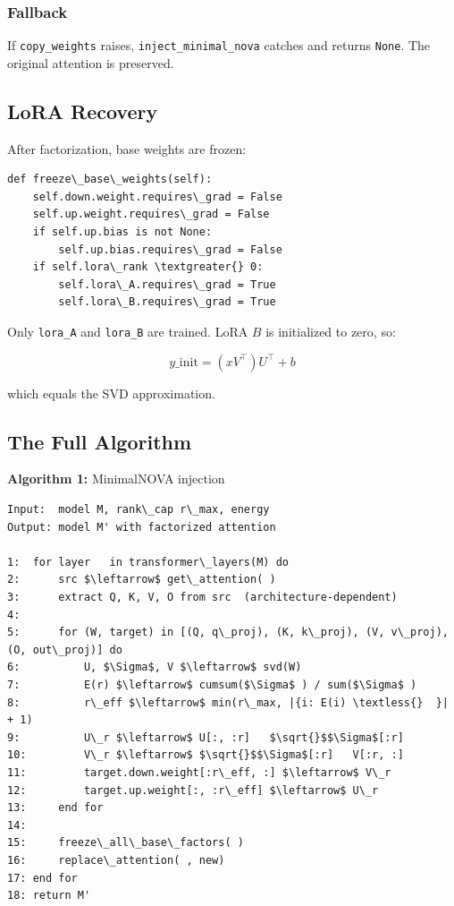 \subsubsection{Fallback}

If \texttt{copy\_weights} raises, \texttt{inject\_minimal\_nova} catches and returns \texttt{None}. 
The original attention is preserved.

\subsection{LoRA Recovery}

After factorization, base weights are frozen:

\begin{lstlisting}
def freeze\_base\_weights(self):
    self.down.weight.requires\_grad = False
    self.up.weight.requires\_grad = False
    if self.up.bias is not None:
        self.up.bias.requires\_grad = False
    if self.lora\_rank \textgreater{} 0:
        self.lora\_A.requires\_grad = True
        self.lora\_B.requires\_grad = True
\end{lstlisting}

Only \texttt{lora\_A} and \texttt{lora\_B} are trained. LoRA $B$ is initialized to zero, so:

\[
y\_{\text{init}} = (x V^\top) U^\top + b
\tag{4.8}
\]

which equals the SVD approximation.

\subsection{The Full Algorithm}

\textbf{Algorithm 1:} MinimalNOVA injection
\begin{lstlisting}
Input:  model M, rank\_cap r\_max, energy  
Output: model M' with factorized attention

1:  for layer   in transformer\_layers(M) do
2:      src $\leftarrow$ get\_attention( )
3:      extract Q, K, V, O from src  (architecture-dependent)
4:
5:      for (W, target) in [(Q, q\_proj), (K, k\_proj), (V, v\_proj), (O, out\_proj)] do
6:          U, $\Sigma$, V $\leftarrow$ svd(W)
7:          E(r) $\leftarrow$ cumsum($\Sigma$ ) / sum($\Sigma$ )
8:          r\_eff $\leftarrow$ min(r\_max, |{i: E(i) \textless{}  }| + 1)
9:          U\_r $\leftarrow$ U[:, :r]   $\sqrt{}$$\Sigma$[:r]
10:         V\_r $\leftarrow$ $\sqrt{}$$\Sigma$[:r]   V[:r, :]
11:         target.down.weight[:r\_eff, :] $\leftarrow$ V\_r
12:         target.up.weight[:, :r\_eff] $\leftarrow$ U\_r
13:     end for
14:
15:     freeze\_all\_base\_factors( )
16:     replace\_attention( , new)
17: end for
18: return M'
\end{lstlisting}

